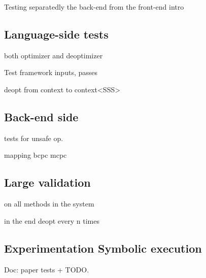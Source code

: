 \documentclass[a4paper,12pt,twoside]{../includes/ThesisStyle}
\begin{document}
Testing separatedly the back-end from the front-end intro

\subsection{Language-side tests}

both optimizer and deoptimizer

Test framework inputs, passes

deopt from context to context<SSS>

\subsection{Back-end side}

tests for unsafe op.

mapping bcpc mcpc

\subsection{Large validation}

on all methods in the system

in the end deopt every n times

\subsection{Experimentation Symbolic execution}

Doc: paper tests + TODO.

\ifx\wholebook\relax\else
    
\end{document}
